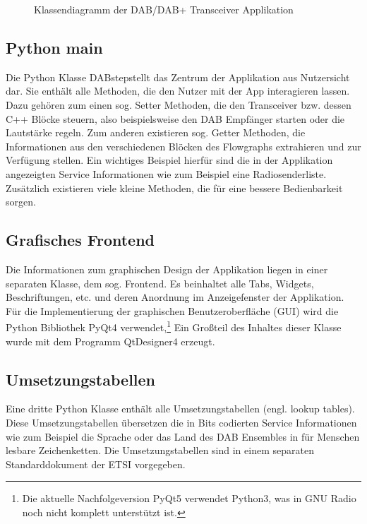 \begin{figure}[b!]
\begin{center}
\begin{tikzpicture}[node distance=1cm]
\end{tikzpicture}
\end{center}
\caption{Klassendiagramm der DAB/DAB+ Transceiver Applikation}
\label{fig:class_diagramm}
\end{figure}

\subsection{Python main}
Die Python Klasse \dq DABstep\dq stellt das Zentrum der Applikation aus Nutzersicht dar. Sie enthält alle Methoden, die den Nutzer mit der App interagieren lassen. Dazu gehören zum einen sog. Setter Methoden, die den Transceiver bzw. dessen C++ Blöcke steuern, also beispielsweise den DAB Empfänger starten oder die Lautstärke regeln. Zum anderen existieren sog. Getter Methoden, die Informationen aus den verschiedenen Blöcken des Flowgraphs extrahieren und zur Verfügung stellen. Ein wichtiges Beispiel hierfür sind die in der Applikation angezeigten Service Informationen wie zum Beispiel eine Radiosenderliste. Zusätzlich existieren viele kleine Methoden, die für eine bessere Bedienbarkeit sorgen.

\subsection{Grafisches Frontend}
Die Informationen zum graphischen Design der Applikation liegen in einer separaten Klasse, dem sog. Frontend. Es beinhaltet alle Tabs, Widgets, Beschriftungen, etc. und deren Anordnung im Anzeigefenster der Applikation. Für die Implementierung der graphischen Benutzeroberfläche (GUI) wird die Python Bibliothek PyQt4 verwendet,\footnote{Die aktuelle Nachfolgeversion PyQt5 verwendet Python3, was in GNU Radio noch nicht komplett unterstützt ist.} Ein Großteil des Inhaltes dieser Klasse wurde mit dem Programm QtDesigner4 erzeugt.

\subsection{Umsetzungstabellen}
Eine dritte Python Klasse enthält alle Umsetzungstabellen (engl. lookup tables). Diese Umsetzungstabellen übersetzen die in Bits codierten Service Informationen wie zum Beispiel die Sprache oder das Land des DAB Ensembles in für Menschen lesbare Zeichenketten. Die Umsetzungstabellen sind in einem separaten Standarddokument der ETSI \cite{etsi:registered_tables} vorgegeben.

